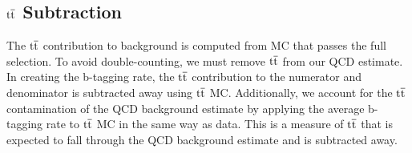 \subsection{$\mathrm{t\overline{t}}$ Subtraction}
\label{sec:ttSubtraction}
\label{sec:bsttSubtraction}
The $\mathrm{t\overline{t}}$ contribution to background is computed from MC that passes the full selection. To avoid double-counting, we must remove $\mathrm{t\overline{t}}$ from our QCD estimate. 
In creating the b-tagging rate, the $\mathrm{t\overline{t}}$ contribution to the numerator and denominator is subtracted away using $\mathrm{t\overline{t}}$ MC. 
Additionally, we account for the $\mathrm{t\overline{t}}$ contamination of the QCD background estimate by applying 
the average b-tagging rate to $\mathrm{t\overline{t}}$ MC in the same way as data.  This is a measure of $\mathrm{t\overline{t}}$ that is expected to fall 
through the QCD background estimate and is subtracted away. 


